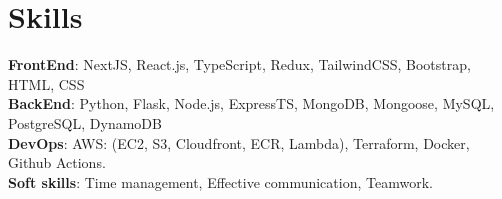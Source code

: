 \documentclass[letterpaper,11pt]{article}
\makeatletter
\newcommand{\resumeItem}[1]{
  \item\small{
    {#1 \vspace{-2pt}}
  }
}
\newcommand{\resumeSubheading}[4]{
  \vspace{-2pt}\item
    \begin{tabular*}{1.0\textwidth}[t]{l@{\extracolsep{\fill}}r}
      \textbf{#1} & \textbf{\small #2} \\
      \textit{\small#3} & \textit{\small #4} \\
    \end{tabular*}\vspace{-7pt}
}
\newcommand{\resumeSubHeadingListStart}{\begin{itemize}[leftmargin=0.0in, label={}]}
\newcommand{\resumeSubHeadingListEnd}{\end{itemize}}
\newcommand{\resumeItemListStart}{\begin{itemize}}
\newcommand{\resumeItemListEnd}{\end{itemize}\vspace{-5pt}}
\makeatother
\begin{document}
%
\section{Skills}
 \begin{itemize}[leftmargin=0.15in, label={}]
    \small{\item{
     \textbf{FrontEnd}{: NextJS, React.js, TypeScript, Redux, TailwindCSS, Bootstrap, HTML, CSS} \\
     \textbf{BackEnd}{: Python, Flask, Node.js, ExpressTS, MongoDB, Mongoose, MySQL, PostgreSQL, DynamoDB} \\
     \textbf{DevOps}{: AWS: (EC2, S3, Cloudfront, ECR, Lambda), Terraform, Docker, Github Actions.} \\
     \textbf{Soft skills}{: Time management, Effective communication, Teamwork.} \\
    }}
 \end{itemize}


        
\end{document}
